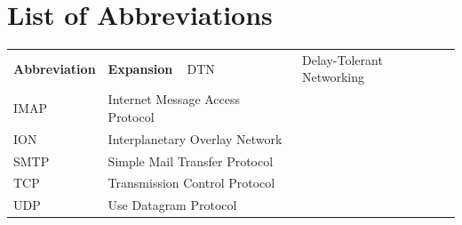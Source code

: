 \chapter*{List of Abbreviations}

\begin{longtable}{@{}p{3cm}p{11.5cm}@{}}
\toprule
\textbf{Abbreviation} & \textbf{Expansion} \
\midrule
\endhead
DTN & Delay-Tolerant Networking \\
IMAP & Internet Message Access Protocol \\
ION & Interplanetary Overlay Network \\
SMTP & Simple Mail Transfer Protocol \\
TCP & Transmission Control Protocol \\
UDP & Use Datagram Protocol \\
\bottomrule
\end{longtable}

